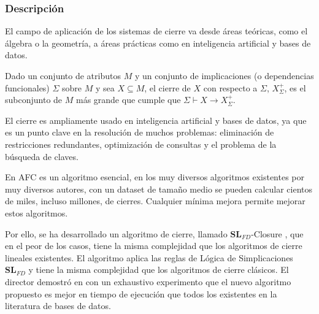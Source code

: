 \subsubsection{Descripci\'on} 



El campo de aplicaci\'on de los sistemas de cierre va desde \'areas te\'oricas, como el \'algebra o la geometr\'ia, a \'areas pr\'acticas como en inteligencia artificial y bases de datos.

Dado un conjunto de atributos \( M \) y un conjunto de implicaciones (o dependencias funcionales) \( \Sigma \) sobre \( M \) y sea \( X \subseteq M \), el cierre de \( X \) con respecto a \( \Sigma \), \( X^+_{\Sigma} \), es el subconjunto de \( M \) m\'as grande que cumple que \( \Sigma \vdash X \to X^+_{\Sigma} \).

El cierre es ampliamente usado en inteligencia artificial y bases de datos, ya que es un punto clave en la resoluci\'on de muchos problemas: eliminaci\'on de restricciones redundantes, optimizaci\'on de consultas y el problema de la b\'usqueda de claves.

En AFC es un algoritmo esencial, en los muy diversos algoritmos existentes por muy diversos autores, con un dataset de tama\~no medio se pueden calcular cientos de miles, incluso millones, de cierres. Cualquier m\'inima mejora permite mejorar estos algoritmos. 

Por ello, se ha desarrollado un algoritmo de cierre, llamado \(\textbf{SL}_{FD}\)-Closure \cite{Mora2012a}, que en el peor de los casos, tiene la misma complejidad que los algoritmos de cierre lineales existentes.
El algoritmo aplica las reglas de L\'ogica de Simplicaciones \(\textbf{SL}_{FD}\) \cite{Cordero2002} y tiene la misma complejidad que los algoritmos de cierre cl\'asicos. El director demostr\'o en \cite{Mora2012a} con un exhaustivo experimento que el nuevo algoritmo propuesto es mejor en tiempo de ejecuci\'on que todos los existentes en la literatura de bases de datos. \\


